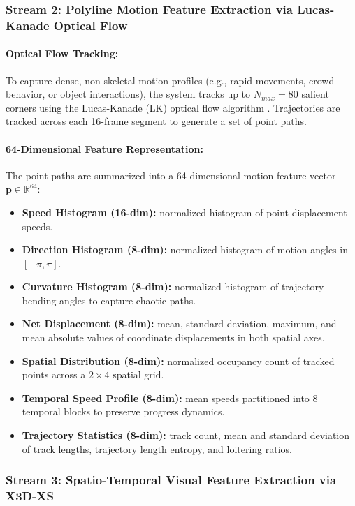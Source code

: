 \documentclass[12pt]{article}
\begin{document}
\subsubsection{Stream 2: Polyline Motion Feature Extraction via Lucas-Kanade Optical Flow}

\paragraph{Optical Flow Tracking:}
To capture dense, non-skeletal motion profiles (e.g., rapid movements, crowd behavior, or object interactions), the system tracks up to $N_{max}=80$ salient corners using the Lucas-Kanade (LK) optical flow algorithm \citep{LK1981}. Trajectories are tracked across each 16-frame segment to generate a set of point paths.

\paragraph{64-Dimensional Feature Representation:}
The point paths are summarized into a 64-dimensional motion feature vector $\mathbf{p} \in \mathbb{R}^{64}$:
\begin{itemize}
    \item \textbf{Speed Histogram (16-dim):} normalized histogram of point displacement speeds.
    \item \textbf{Direction Histogram (8-dim):} normalized histogram of motion angles in $[-\pi, \pi]$.
    \item \textbf{Curvature Histogram (8-dim):} normalized histogram of trajectory bending angles to capture chaotic paths.
    \item \textbf{Net Displacement (8-dim):} mean, standard deviation, maximum, and mean absolute values of coordinate displacements in both spatial axes.
    \item \textbf{Spatial Distribution (8-dim):} normalized occupancy count of tracked points across a $2 \times 4$ spatial grid.
    \item \textbf{Temporal Speed Profile (8-dim):} mean speeds partitioned into 8 temporal blocks to preserve progress dynamics.
    \item \textbf{Trajectory Statistics (8-dim):} track count, mean and standard deviation of track lengths, trajectory length entropy, and loitering ratios.
\end{itemize}

\subsubsection{Stream 3: Spatio-Temporal Visual Feature Extraction via X3D-XS}
\end{document}
